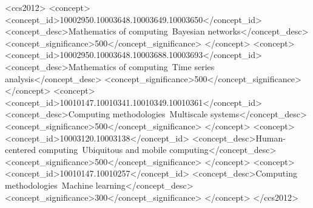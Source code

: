 \documentclass[sigconf]{acmart}
\begin{document}
\begin{CCSXML}
<ccs2012>
   <concept>
       <concept_id>10002950.10003648.10003649.10003650</concept_id>
       <concept_desc>Mathematics of computing~Bayesian networks</concept_desc>
       <concept_significance>500</concept_significance>
       </concept>
   <concept>
       <concept_id>10002950.10003648.10003688.10003693</concept_id>
       <concept_desc>Mathematics of computing~Time series analysis</concept_desc>
       <concept_significance>500</concept_significance>
       </concept>
   <concept>
       <concept_id>10010147.10010341.10010349.10010361</concept_id>
       <concept_desc>Computing methodologies~Multiscale systems</concept_desc>
       <concept_significance>500</concept_significance>
       </concept>
   <concept>
       <concept_id>10003120.10003138</concept_id>
       <concept_desc>Human-centered computing~Ubiquitous and mobile computing</concept_desc>
       <concept_significance>500</concept_significance>
       </concept>
   <concept>
       <concept_id>10010147.10010257</concept_id>
       <concept_desc>Computing methodologies~Machine learning</concept_desc>
       <concept_significance>300</concept_significance>
       </concept>
 </ccs2012>
\end{CCSXML}



\maketitle
\end{document}
